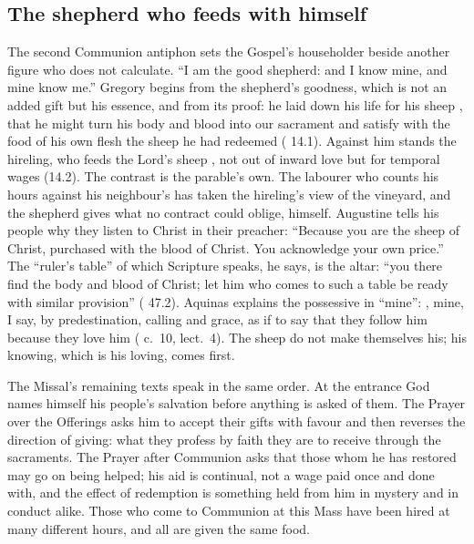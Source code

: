 \subsection{The shepherd who feeds with himself}

The second Communion antiphon sets the Gospel's householder beside another
figure who does not calculate. ``I am the good shepherd: and I know mine, and
mine know me.'' Gregory begins from the shepherd's goodness, which is not an
added gift but his essence, and from its proof: he laid down his life for his
sheep , that he might turn his
body and blood into our sacrament and satisfy with the food of his own flesh
the sheep he had redeemed ( 14.1).
Against him stands the hireling, who feeds the Lord's sheep , not out of inward love but
for temporal wages (14.2). The contrast is the parable's own. The labourer who
counts his hours against his neighbour's has taken the hireling's view of the
vineyard, and the shepherd gives what no contract could oblige, himself.
Augustine tells his people why they listen to Christ in their preacher:
``Because you are the sheep of Christ, purchased with the blood of Christ. You
acknowledge your own price.'' The ``ruler's table'' of which Scripture speaks, he says, is
the altar: ``you there find the body and blood of Christ; let him who comes to
such a table be ready with similar provision'' ( 47.2). Aquinas explains the possessive in ``mine'': , mine, I say, by
predestination, calling and grace, as if to say that they follow him because
they love him ( c.~10, lect.~4). The sheep do not make
themselves his; his knowing, which is his loving, comes first.

The Missal's remaining texts speak in the same order. At the entrance God
names himself his people's salvation before anything is asked of them. The
Prayer over the Offerings asks him to accept their gifts with favour and then
reverses the direction of giving: what they profess by faith they are to
receive through the sacraments. The Prayer after Communion asks that those
whom he has restored may go on being helped; his aid is continual, not a wage
paid once and done with, and the effect of redemption is something held from
him in mystery and in conduct alike. Those who come to Communion at this Mass
have been hired at many different hours, and all are given the same food.

